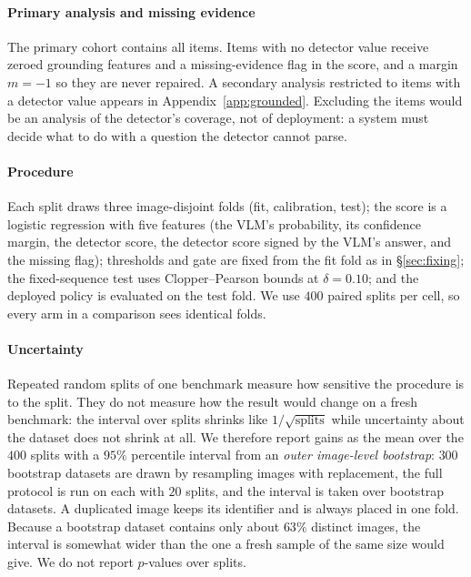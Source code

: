 \begin{table}[t]
\centering
\caption{Cohort flow. ``Detector value'' is the number of items for which the detector returned a score; the
remaining items stay in every analysis, keep the channel-1 decision, and cannot be repaired. In POPE the
exclusions are object phrases the extraction script failed to parse (POPE contains the typo ``imange''); in AMBER
they are the attribute and relation queries, which name no object. ICC is the intra-image correlation of the
model's errors.}
\label{tab:cohort}
\small
\resizebox{\textwidth}{!}{}
\end{table}

\paragraph{Primary analysis and missing evidence}
The primary cohort contains all items. Items with no detector value receive zeroed grounding features and a
missing-evidence flag in the score, and a margin $m=-1$ so they are never repaired. A secondary analysis restricted to
items with a detector value appears in Appendix~\ref{app:grounded}. Excluding the items would be an analysis of the
detector's coverage, not of deployment: a system must decide what to do with a question the detector cannot parse.

\paragraph{Procedure}
Each split draws three image-disjoint folds (fit, calibration, test); the score is a logistic regression with five
features (the VLM's probability, its confidence margin, the detector score, the detector score signed by the VLM's
answer, and the missing flag); thresholds and gate are fixed from the fit fold as in \S\ref{sec:fixing}; the
fixed-sequence test uses Clopper--Pearson bounds at $\delta=0.10$; and the deployed policy is evaluated on the test fold.
We use $400$ paired splits per cell, so every arm in a comparison sees identical folds.

\paragraph{Uncertainty}
Repeated random splits of one benchmark measure how sensitive the procedure is to the split. They do not
measure how the result would change on a fresh benchmark: the interval over splits shrinks like $1/\sqrt{\text{splits}}$ while
uncertainty about the dataset does not shrink at all. We therefore report gains as the mean over the $400$ splits
with a $95\%$ percentile interval from an \emph{outer image-level bootstrap}: $300$ bootstrap datasets
are drawn by resampling images with replacement, the full protocol is run on each with $20$ splits, and the
interval is taken over bootstrap datasets. A duplicated image keeps its identifier and is always placed in one fold. Because a
bootstrap dataset contains only about $63\%$ distinct images, the interval is somewhat wider than the one a
fresh sample of the same size would give. We do not report $p$-values over splits.


